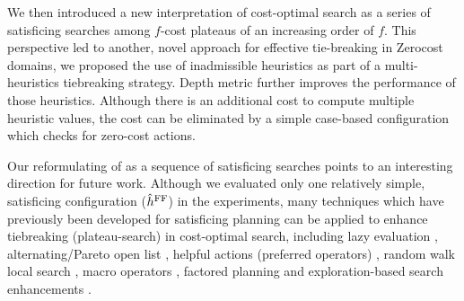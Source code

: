 We then introduced a new interpretation of cost-optimal \astar search as a series of satisficing
       searches among $f$-cost plateaus of an increasing order of $f$. 
This perspective led to another, novel approach for effective tie-breaking in Zerocost domains, we proposed the use of
       inadmissible heuristics as part of a multi-heuristics tiebreaking strategy.
       Depth metric further improves the performance of those
       heuristics. Although there is an additional cost to compute
       multiple heuristic values, the cost can be eliminated by a simple
       case-based configuration which checks for zero-cost actions.

Our reformulating of \astar as a sequence of satisficing searches  points to  an interesting direction for future work.
Although we evaluated only one relatively simple, satisficing configuration ($\hat{h}^{\text{FF}}$) in
the experiments, many techniques which have previously been developed for satisficing planning can be applied to enhance tiebreaking (plateau-search) in cost-optimal search, including
lazy evaluation \cite{richter2010lama}, alternating/Pareto open
list \cite{RogerH10}, helpful actions (preferred operators) \cite{Hoffmann01},
random walk local search \cite{nakhost2009monte}, macro operators
\cite{Botea2005,ChrpaVM15}, factored planning
\cite{amir2003factored,brafman2006factored,Asai2015} and
exploration-based search enhancements
\cite{valenzano2014comparison,xie14type,Valenzano2016}.


